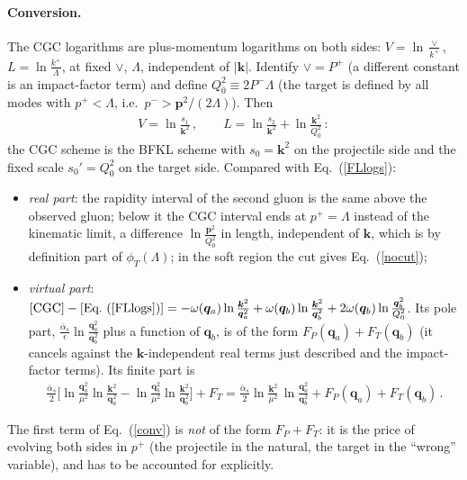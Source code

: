 \documentclass[11pt,a4paper]{article}
\renewcommand{\v}[1]{\bm{#1}}
\newcommand{\ab}{\bar\alpha_s}
\begin{document}
\paragraph{Conversion.} The CGC logarithms are plus-momentum logarithms on both sides: $V=\ln\frac\vee{k^+}$, $L=\ln\frac{k^+}{\Lambda}$, at fixed $\vee$, $\Lambda$, independent of $|\v k|$. Identify $\vee=P^+$ (a different constant is an impact-factor term) and define $Q_0^2\equiv2P^-\Lambda$ (the target is defined by all modes with $p^+<\Lambda$, i.e.\ $p^->\v p^2/(2\Lambda)$). Then
\begin{align}
V=\ln\frac{s_1}{\v k^2}\,,\qquad L=\ln\frac{s_2}{\v k^2}+\ln\frac{\v k^2}{Q_0^2}\,:
\end{align}
the CGC scheme is the BFKL scheme with $s_{0}=\v k^2$ on the projectile side and the fixed scale $s_0'=Q_0^2$ on the target side. Compared with Eq.~(\ref{FLlogs}):
\begin{itemize}
\item \emph{real part}: the rapidity interval of the second gluon is the same above the observed gluon; below it the CGC interval ends at $p^+=\Lambda$ instead of the kinematic limit, a difference $\ln\frac{\v p^2}{Q_0^2}$ in length, independent of $\v k$, which is by definition part of $\phi_T(\Lambda)$; in the soft region the cut gives Eq.~(\ref{nocut});
\item \emph{virtual part}: $[\text{CGC}]-[\text{Eq.~(\ref{FLlogs})}]=-\omega(\v q_a)\ln\frac{\v k^2}{\v q_a^2}+\omega(\v q_b)\ln\frac{\v k^2}{\v q_b^2}+2\omega(\v q_b)\ln\frac{\v q_b^2}{Q_0^2}$. Its pole part, $\frac{\ab}{\epsilon}\ln\frac{\v q_a^2}{\v q_b^2}$ plus a function of $\v q_b$, is of the form $F_P(\v q_a)+F_T(\v q_b)$ (it cancels against the $\v k$-independent real terms just described and the impact-factor terms). Its finite part is
\begin{align}
\frac{\ab}{2}\Big[\ln\frac{\v q_a^2}{\mu^2}\ln\frac{\v k^2}{\v q_a^2}-\ln\frac{\v q_b^2}{\mu^2}\ln\frac{\v k^2}{\v q_b^2}\Big]+F_T=\frac{\ab}{2}\ln\frac{\v k^2}{\mu^2}\,\ln\frac{\v q_a^2}{\v q_b^2}+F_P(\v q_a)+F_T(\v q_b)\,.\label{conv}
\end{align}
\end{itemize}
The first term of Eq.~(\ref{conv}) is \emph{not} of the form $F_P+F_T$: it is the price of evolving both sides in $p^+$ (the projectile in the natural, the target in the ``wrong'' variable), and has to be accounted for explicitly.
\end{document}
